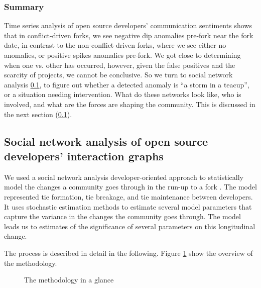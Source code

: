 \documentclass[12pt,letterpaper]{gthesis2}  %
\begin{document}
\subsubsection{Summary}
Time series analysis of open source developers’ communication sentiments shows that in conflict-driven forks, we see negative dip anomalies pre-fork near the fork date, in contrast to the non-conflict-driven forks, where we see either no anomalies, or positive spikes anomalies pre-fork. 
We got close to determining when one vs. other has occurred, however, given the false positives and the scarcity of projects, we cannot be conclusive. So we turn to social network analysis \ref{socialNetworkAnalysisMethodology}, to figure out whether a detected anomaly is ``a storm in a teacup'', or a situation needing intervention. What do these networks look like, who is involved, and what are the forces are shaping the community. This is discussed in the next section (\ref{socialNetworkAnalysisMethodology}).


\subsection{Social network analysis of open source developers’ interaction graphs}
\label{socialNetworkAnalysisMethodology}
We used a social network analysis developer-oriented approach to statistically model the changes a community goes through in the run-up to a fork \cite{AzarbakhtOSS2017}. The model represented tie formation, tie breakage, and tie maintenance between developers. It uses stochastic estimation methods to estimate several model parameters that capture the variance in the changes the community goes through. The model leads us to estimates of the significance of several parameters on this longitudinal change.

The process is described in detail in the following. Figure \ref{FlowChart} show the overview of the methodology.

\begin{figure}[!ht]
\centering
{}
\caption{The methodology in a glance}
\label{FlowChart}
\end{figure}

%

\end{document}
